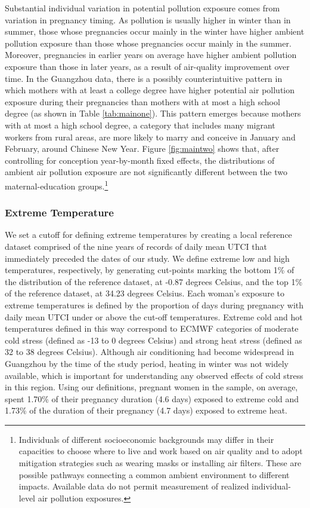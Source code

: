 Substantial individual variation in potential pollution exposure comes from
variation in pregnancy timing. As pollution is usually higher in winter
than in summer, those whose pregnancies occur mainly in the winter have
higher ambient pollution exposure than those whose pregnancies occur mainly in
the summer. Moreover, pregnancies in earlier years on average have
higher ambient pollution exposure than those in later years, as a
result of air-quality improvement over time. In the Guangzhou data, there is a possibly counterintuitive pattern in which mothers with at least a college degree have higher potential air
pollution exposure during their pregnancies than mothers with at most a high school degree (as
shown in Table \ref{tab:mainone}). This pattern emerges because mothers with at most a high school degree, a category that includes many migrant workers from rural areas, are more likely to marry and conceive in January and February, around Chinese New Year.  Figure \ref{fig:maintwo} shows that, after controlling for conception
year-by-month fixed effects, the distributions of ambient air pollution exposure
are not significantly different between the two maternal-education
groups.\footnote{Individuals of different socioeconomic backgrounds may differ in their capacities to choose where to live and work based on air quality and to adopt mitigation strategies such as wearing masks or installing air filters. These are possible pathways connecting a common ambient environment to different impacts.  Available data do not permit measurement of realized individual-level air pollution exposures.}

\subsubsection{Extreme Temperature\label{extreme-temperature}}

We set a cutoff for defining extreme temperatures by creating a local
reference dataset comprised of the nine years of records of daily mean
UTCI that immediately preceded the dates of our study. We define extreme
low and high temperatures, respectively, by generating cut-points
marking the bottom 1\% of the distribution of the reference dataset, at
-0.87 degrees Celsius, and the top 1\% of the reference dataset,
at 34.23 degrees Celsius. Each woman's exposure to extreme temperatures
is defined by the proportion of days during pregnancy with daily mean
UTCI under or above the cut-off temperatures. Extreme cold and hot
temperatures defined in this way correspond to ECMWF categories of
moderate cold stress (defined as -13 to 0 degrees Celsius) and strong heat stress (defined as 32 to 38 degrees Celsius). Although air
conditioning had become widespread in Guangzhou by the time of the study
period, heating in winter was not widely available, which is important
for understanding any observed effects of cold stress in this region. Using our definitions, pregnant women in the sample, on average, spent 1.70\% of
their pregnancy duration (4.6 days) exposed to extreme cold and 1.73\%
of the duration of their pregnancy (4.7 days) exposed to extreme heat. 

